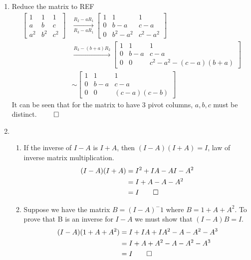 \documentclass[12pt, a4paper]{article}
\begin{document}
\begin{enumerate}[Q\arabic*.]
  \item Reduce the matrix to REF 
    \begin{align*}
      \begin{bmatrix}
        1 & 1 & 1 \\ a & b & c \\ a^2 & b^2 & c^2
      \end{bmatrix} &\xrightarrow[R_3-aR_1]{R_2-aR_1}
      \begin{bmatrix}
        1 & 1 & 1 \\ 0 & b - a & c - a \\ 0 & b^2 - a^2 & c^2 - a^2
      \end{bmatrix} \\ &\xrightarrow{R_3-(b+a)R_2}
      \begin{bmatrix}
        1 & 1 & 1 \\ 0 & b-a & c-a \\ 0 & 0 & c^2 -a^2 - (c-a)(b+a)
      \end{bmatrix} \\ &\sim
      \begin{bmatrix}
        1 & 1 & 1 \\ 0 & b-a & c-a \\ 0 & 0 & (c-a)(c-b)
      \end{bmatrix}
    \end{align*}
    It can be seen that for the matrix to have 3 pivot columns, $a, b, c$ must be distinct. $\qed$

    \item
      \begin{enumerate}[(\alph*)]
        \item If the inverse of $I - A$ is $I + A$, then $(I - A)(I + A) = I$, law of inverse matrix multiplication.
          \begin{align*}
            (I-A)(I+A) &= I^2 + IA - AI - A^2 \\
                       &= I + A - A - A^2 \\
                       &= I \qed
          \end{align*}

        \item Suppose we have the matrix $B = (I - A)^-1$ where $B = 1 + A + A^2$. To prove that B is an inverse for $I - A$ we must show that $(I-A)B = I$.
          \begin{align*}
            (I-A)(1 + A + A^2) &= I + IA + IA^2 - A - A^2 - A^3 \\
                               &= I + A + A^2 - A - A^2 - A^3 \\
                               &= I \qed
          \end{align*}


\end{enumerate}
\end{enumerate}
\end{document}
